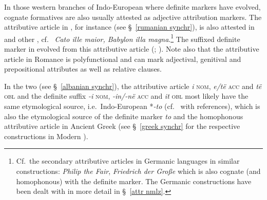 {In those western branches of Indo-European where definite markers have evolved, cognate formatives are also usually attested as adjective attribution markers. The attributive article in , for instance (see \S~\ref{rumanian synchr}), is also attested in  and other , cf.~ \textit{Cato ille maior, Babylon illa magna}.\footnote{Cf.~the secondary attributive articles in Germanic languages in similar constructions:  \textit{Philip the Fair},  \textit{Friedrich der Große} which is also cognate (and homophonous) with the definite marker. The Germanic constructions have been dealt with in more detail in \S~\ref{attr nmlz}.} The suffixed definite marker in  evolved from this attributive article (\citealt{gamillscheg1937}; \citealt[5]{nocentini1996}). Note also that the attributive article in Romance is polyfunctional and can mark adjectival, genitival and prepositional attributes as well as relative clauses.

In the two  (see \S~\ref{albanian synchr}), the attributive article \textit{i} \textsc{nom}, \textit{e/të} \textsc{acc} and \textit{të} \textsc{obl} and the definite suffix \textit{-i} \textsc{nom}, \textit{-in/-në} \textsc{acc} and \textit{it} \textsc{obl} most likely have the same etymological source, i.e.~Indo-European *\textit{-to} (cf.~\citet[165]{himmelmann1997} with references), which is also the etymological source of the definite marker \textit{to} and the homophonous attributive article in Ancient Greek (see \S~\ref{greek synchr} for the respective constructions in Modern ).

}
